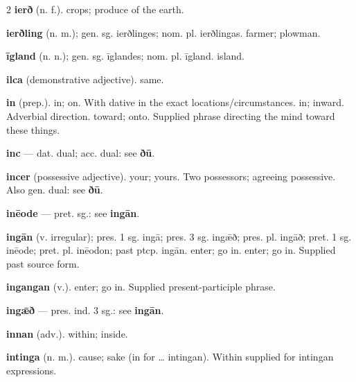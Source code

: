 \begin{multicols*}{2}
\textbf{ierð} (n. f.). crops; produce of the earth.\par
\textbf{ierðling} (n. m.); gen. sg. ierðlinges; nom. pl. ierðlingas. farmer; plowman.\par
\textbf{īgland} (n. n.); gen. sg. īglandes; nom. pl. īgland. island.\par
\textbf{ilca} (demonstrative adjective). same.\par
\textbf{in} (prep.). in; on. With dative in the exact locations/circumstances. in; inward. Adverbial direction. toward; onto. Supplied phrase directing the mind toward these things.\par
\textbf{inc} — dat. dual; acc. dual: see \textbf{ðū}.\par
\textbf{incer} (possessive adjective). your; yours. Two possessors; agreeing possessive. Also gen. dual: see \textbf{ðū}.\par
\textbf{inēode} — pret. sg.: see \textbf{ingān}.\par
\textbf{ingān} (v. irregular); pres. 1 sg. ingā; pres. 3 sg. ingǣð; pres. pl. ingāð; pret. 1 sg. inēode; pret. pl. inēodon; past ptcp. ingān. enter; go in. enter; go in. Supplied past source form.\par
\textbf{ingangan} (v.). enter; go in. Supplied present-participle phrase.\par
\textbf{ingǣð} — pres. ind. 3 sg.: see \textbf{ingān}.\par
\textbf{innan} (adv.). within; inside.\par
\textbf{intinga} (n. m.). cause; sake (in for … intingan). Within supplied for intingan expressions.\par

\end{multicols*}
